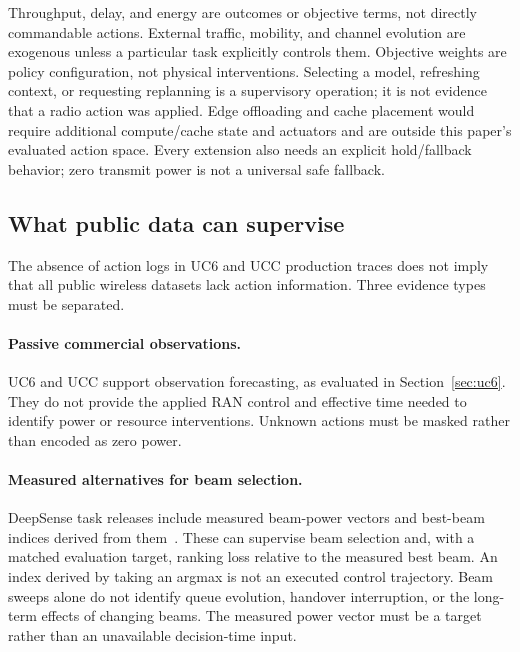 Throughput, delay, and energy are outcomes or objective terms, not directly
commandable actions. External traffic, mobility, and channel evolution are
exogenous unless a particular task explicitly controls them. Objective weights
are policy configuration, not physical interventions. Selecting a model,
refreshing context, or requesting replanning is a supervisory operation; it is
not evidence that a radio action was applied. Edge offloading and cache placement
would require additional compute/cache state and actuators and are outside this
paper's evaluated action space. Every extension also needs an explicit
hold/fallback behavior; zero transmit power is not a universal safe fallback.

\subsection{What public data can supervise}
\label{sec:action-data}
The absence of action logs in UC6 and UCC production traces does not imply that
all public wireless datasets lack action information. Three evidence types
must be separated.

\paragraph{Passive commercial observations.}
UC6 and UCC support observation forecasting, as evaluated in
Section~\ref{sec:uc6}. They do not provide the applied RAN control and effective
time needed to identify power or resource interventions. Unknown actions must
be masked rather than encoded as zero power.

\paragraph{Measured alternatives for beam selection.}
DeepSense task releases include measured beam-power vectors and best-beam
indices derived from them~\cite{deepsensebeam}. These can supervise beam
selection and, with a matched evaluation target, ranking loss relative to the
measured best beam. An index derived by taking an argmax is not an executed
control trajectory. Beam sweeps alone do not identify queue evolution,
handover interruption, or the long-term effects of changing beams. The measured
power vector must be a target rather than an unavailable decision-time input.

